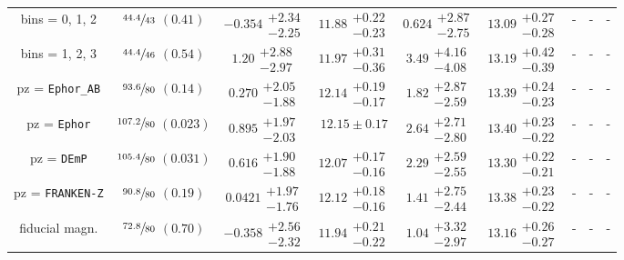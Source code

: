 \documentclass[a4paper,11pt]{article}
\begin{document}
\begin{table}
\begin{center}
\begin{tabular}{ccccccccc}
bins = 0, 1, 2 & $\sfrac{44.4}{43}$ $(0.41)$ & $-0.354\substack{+2.34 \\ -2.25}$ & $11.88\substack{+0.22 \\ -0.23}$ & $0.624\substack{+2.87 \\ -2.75}$ & $13.09\substack{+0.27 \\ -0.28}$ & - & - & - \\
bins = 1, 2, 3 & $\sfrac{44.4}{46}$ $(0.54)$ & $1.20\substack{+2.88 \\ -2.97}$ & $11.97\substack{+0.31 \\ -0.36}$ & $3.49\substack{+4.16 \\ -4.08}$ & $13.19\substack{+0.42 \\ -0.39}$ & - & - & - \\
pz = \texttt{Ephor\_AB} & $\sfrac{93.6}{80}$ $(0.14)$ & $0.270\substack{+2.05 \\ -1.88}$ & $12.14\substack{+0.19 \\ -0.17}$ & $1.82\substack{+2.87 \\ -2.59}$ & $13.39\substack{+0.24 \\ -0.23}$ & - & - & - \\
pz = \texttt{Ephor} & $\sfrac{107.2}{80}$ $(0.023)$ & $0.895\substack{+1.97 \\ -2.03}$ & $12.15 \pm 0.17$ & $2.64\substack{+2.71 \\ -2.80}$ & $13.40\substack{+0.23 \\ -0.22}$ & - & - & - \\
pz = \texttt{DEmP} & $\sfrac{105.4}{80}$ $(0.031)$ & $0.616\substack{+1.90 \\ -1.88}$ & $12.07\substack{+0.17 \\ -0.16}$ & $2.29\substack{+2.59 \\ -2.55}$ & $13.30\substack{+0.22 \\ -0.21}$ & - & - & - \\
pz = \texttt{FRANKEN-Z} & $\sfrac{90.8}{80}$ $(0.19)$ & $0.0421\substack{+1.97 \\ -1.76}$ & $12.12\substack{+0.18 \\ -0.16}$ & $1.41\substack{+2.75 \\ -2.44}$ & $13.38\substack{+0.23 \\ -0.22}$ & - & - & - \\
fiducial magn. & $\sfrac{72.8}{80}$ $(0.70)$ & $-0.358\substack{+2.56 \\ -2.32}$ & $11.94\substack{+0.21 \\ -0.22}$ & $1.04\substack{+3.32 \\ -2.97}$ & $13.16\substack{+0.26 \\ -0.27}$  & - & - & - \\

\end{tabular}
\end{center}
\end{table}
\end{document}
